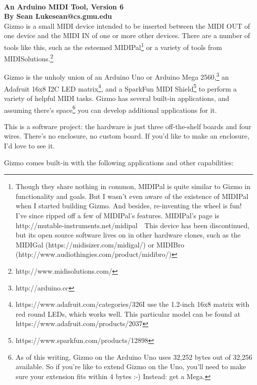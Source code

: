 \documentclass{article}
\begin{document}
\\[0.5em]
{\large \bf An Arduino MIDI Tool, Version 6\\
By Sean Luke\quad sean@cs.gmu.edu} 
\\


\noindent Gizmo is a small MIDI device intended to be inserted between the MIDI OUT of one device and the MIDI IN of one or more other devices.  There are a number of tools like this, such as the esteemed MIDIPal\footnote{Though they share nothing in common, MIDIPal is quite similar to Gizmo in functionality and goals.  But I wasn't even aware of the existence of MIDIPal when I started building Gizmo.  And besides, re-inventing the wheel is fun!  I've since ripped off a few of MIDIPal's features.  MIDIPal's page is http:/\!/mutable-instruments.net/midipal\ \ This device has been discontinued, but its open source software lives on in other hardware clones, such as the MIDIGal (https:/\!/midisizer.com/midigal/) or MIDIBro (http:/\!/www.audiothingies.com/product/midibro/)} or a variety of tools from MIDISolutions.\footnote{http:/\!/www.midisolutions.com/}

Gizmo is the unholy union of an Arduino Uno or Arduino Mega 2560,\footnote{http:/\!/arduino.cc} an Adafruit 16x8 I2C LED matrix\footnote{https:/\!/www.adafruit.com/categories/326\quad I use the 1.2-inch 16x8 matrix with red round LEDs, which works well.  This particular model can be found at https:/\!/www.adafruit.com/products/2037}, and a SparkFun MIDI Shield\footnote{https:/\!/www.sparkfun.com/products/12898} to perform a variety of helpful MIDI tasks.  Gizmo has several built-in applications, and assuming there's space\footnote{As of this writing, Gizmo on the Arduino Uno uses 32,252 bytes out of 32,256 available.  So if you're like to extend Gizmo on the Uno, you'll need to make sure your extension fits within 4 bytes :-)  Instead: get a Mega.} you can develop additional applications for it.

This is a software project: the hardware is just three off-the-shelf boards and four wires.  There's no enclosure, no custom board.  If you'd like to make an enclosure, I'd love to see it.

Gizmo comes built-in with the following applications and other capabilities:
\end{document}
